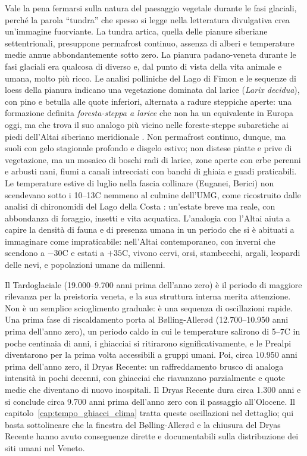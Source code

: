 Vale la pena fermarsi sulla natura del paesaggio vegetale durante le fasi glaciali, perché la parola ``tundra'' che spesso si legge nella letteratura divulgativa crea un'immagine fuorviante. La tundra artica, quella delle pianure siberiane settentrionali, presuppone permafrost continuo, assenza di alberi e temperature medie annue abbondantemente sotto zero. La pianura padano-veneta durante le fasi glaciali era qualcosa di diverso e, dal punto di vista della vita animale e umana, molto più ricco. Le analisi polliniche del Lago di Fimon \citep{pini2010} e le sequenze di loess della pianura \citep{cremaschi1990} indicano una vegetazione dominata dal larice (\textit{Larix decidua}), con pino e betulla alle quote inferiori, alternata a radure steppiche aperte: una formazione definita \textit{foresta-steppa a larice} che non ha un equivalente in Europa oggi, ma che trova il suo analogo più vicino nelle foreste-steppe subarctiche ai piedi dell'Altai siberiano meridionale \citep{pini2022}. Non permafrost continuo, dunque, ma suoli con gelo stagionale profondo e disgelo estivo; non distese piatte e prive di vegetazione, ma un mosaico di boschi radi di larice, zone aperte con erbe perenni e arbusti nani, fiumi a canali intrecciati con banchi di ghiaia e guadi praticabili. Le temperature estive di luglio nella fascia collinare (Euganei, Berici) non scendevano sotto i 10--13\textdegree C nemmeno al culmine dell'UMG, come ricostruito dalle analisi di chironomidi del Lago della Costa \citep{samartin2016}: un'estate breve ma reale, con abbondanza di foraggio, insetti e vita acquatica. L'analogia con l'Altai aiuta a capire la densità di fauna e di presenza umana in un periodo che si è abituati a immaginare come impraticabile: nell'Altai contemporaneo, con inverni che scendono a $-30$\textdegree C e estati a $+35$\textdegree C, vivono cervi, orsi, stambecchi, argali, leopardi delle nevi, e popolazioni umane da millenni.

Il Tardoglaciale (19.000--9.700 anni prima dell'anno zero) è il periodo di maggiore rilevanza per la preistoria veneta, e la sua struttura interna merita attenzione. Non è un semplice scioglimento graduale: è una sequenza di oscillazioni rapide. Una prima fase di riscaldamento porta al Bølling-Allerød (12.700--10.950 anni prima dell'anno zero), un periodo caldo in cui le temperature salirono di 5--7\textdegree C in poche centinaia di anni, i ghiacciai si ritirarono significativamente, e le Prealpi diventarono per la prima volta accessibili a gruppi umani. Poi, circa 10.950 anni prima dell'anno zero, il Dryas Recente: un raffreddamento brusco di analoga intensità in pochi decenni, con ghiacciai che riavanzano parzialmente e quote medie che diventano di nuovo inospitali. Il Dryas Recente dura circa 1.300 anni e si conclude circa 9.700 anni prima dell'anno zero con il passaggio all'Olocene. Il capitolo~\ref{cap:tempo_ghiacci_clima} tratta queste oscillazioni nel dettaglio; qui basta sottolineare che la finestra del Bølling-Allerød e la chiusura del Dryas Recente hanno avuto conseguenze dirette e documentabili sulla distribuzione dei siti umani nel Veneto.

